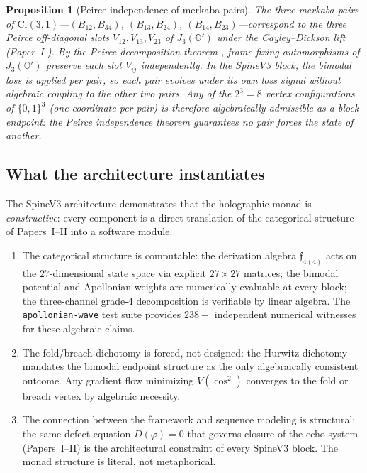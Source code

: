 \documentclass[11pt,a4paper]{article}
\theoremstyle{plain}
\newtheorem{proposition}[theorem]{Proposition}
\theoremstyle{definition}
\theoremstyle{remark}
\numberwithin{equation}{section}
\providecommand{\Cl}{\mathrm{Cl}}
\providecommand{\Os}{\mathbb{O}'}
\providecommand{\vp}{\varphi}
\providecommand{\fk}[1]{\mathfrak{#1}}
\begin{document}
\begin{proposition}[Peirce independence of merkaba pairs]
\label{prop:peirce-independence}
The three merkaba pairs of $\Cl(3,1)$---$(B_{12}, B_{34})$,
$(B_{13}, B_{24})$, $(B_{14}, B_{23})$---correspond to the three
Peirce off-diagonal slots $V_{12}, V_{13}, V_{23}$ of $J_3(\Os)$
under the Cayley--Dickson lift
(Paper~I \cite[\S 4, Thm.~4.2]{paper-I-substrate}).
By the Peirce decomposition theorem \cite{jacobson1968},
frame-fixing automorphisms of $J_3(\Os)$
preserve each slot $V_{ij}$ independently.  In the SpineV3 block,
the bimodal loss is applied per pair, so each pair evolves under
its own loss signal without algebraic coupling to the other two
pairs.  Any of the $2^3 = 8$ vertex configurations of
$\{0,1\}^3$ (one coordinate per pair) is therefore algebraically
admissible as a block endpoint: the Peirce independence theorem
guarantees no pair forces the state of another.
\end{proposition}

\subsection{What the architecture instantiates}

The SpineV3 architecture demonstrates that the holographic monad
is \emph{constructive}: every component is a direct translation
of the categorical structure of Papers~I--II into a software
module.
\begin{enumerate}[label=\textnormal{(\arabic*)}]
\item The categorical structure is computable: the derivation
  algebra $\fk{f}_{4(4)}$ acts on the $27$-dimensional state
  space via explicit $27 \times 27$ matrices; the bimodal
  potential and Apollonian weights are numerically evaluable at
  every block; the three-channel grade-$4$ decomposition is
  verifiable by linear algebra.  The \texttt{apollonian-wave}
  test suite provides $238+$ independent numerical witnesses
  for these algebraic claims.
\item The fold/breach dichotomy is forced, not designed: the
  Hurwitz dichotomy \cite[\S 4, Thm.~4.2]{paper-I-substrate} mandates
  the bimodal endpoint structure as the only algebraically
  consistent outcome.  Any gradient flow minimizing $V(\cos^2)$
  converges to the fold or breach vertex by algebraic necessity.
\item The connection between the framework and sequence modeling
  is structural: the same defect equation $D(\vp) = 0$ that
  governs closure of the echo system (Papers~I--II) is the
  architectural constraint of every SpineV3 block.  The monad
  structure is literal, not metaphorical.
\end{enumerate}
\end{document}
